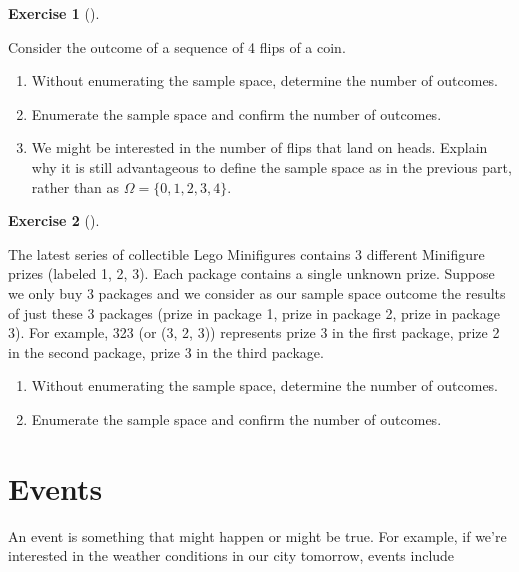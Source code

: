 \documentclass[
  letterpaper,
  DIV=11,
  numbers=noendperiod]{scrreprt}
\providecommand{\tightlist}{%
  \setlength{\itemsep}{0pt}\setlength{\parskip}{0pt}}
\theoremstyle{plain}
\theoremstyle{definition}
\theoremstyle{definition}
\newtheorem{exercise}{Exercise}[chapter]
\theoremstyle{definition}
\theoremstyle{remark}
\begin{document}
\begin{exercise}[]\protect\hypertarget{exr-coin4-outcome}{}\label{exr-coin4-outcome}

Consider the outcome of a sequence of 4 flips of a coin.

\begin{enumerate}
\def\labelenumi{\arabic{enumi}.}
\tightlist
\item
  Without enumerating the sample space, determine the number of
  outcomes.
\item
  Enumerate the sample space and confirm the number of outcomes.
\item
  We might be interested in the number of flips that land on heads.
  Explain why it is still advantageous to define the sample space as in
  the previous part, rather than as \(\Omega=\{0, 1, 2, 3, 4\}\).
\end{enumerate}

\end{exercise}

\begin{exercise}[]\protect\hypertarget{exr-collector4-outcome}{}\label{exr-collector4-outcome}

The latest series of collectible Lego Minifigures contains 3 different
Minifigure prizes (labeled 1, 2, 3). Each package contains a single
unknown prize. Suppose we only buy 3 packages and we consider as our
sample space outcome the results of just these 3 packages (prize in
package 1, prize in package 2, prize in package 3). For example, 323 (or
(3, 2, 3)) represents prize 3 in the first package, prize 2 in the
second package, prize 3 in the third package.

\begin{enumerate}
\def\labelenumi{\arabic{enumi}.}
\tightlist
\item
  Without enumerating the sample space, determine the number of
  outcomes.
\item
  Enumerate the sample space and confirm the number of outcomes.
\end{enumerate}

\end{exercise}

\section{Events}\label{sec-language-events}

An event is something that might happen or might be true. For example,
if we're interested in the weather conditions in our city tomorrow,
events include
\end{document}
